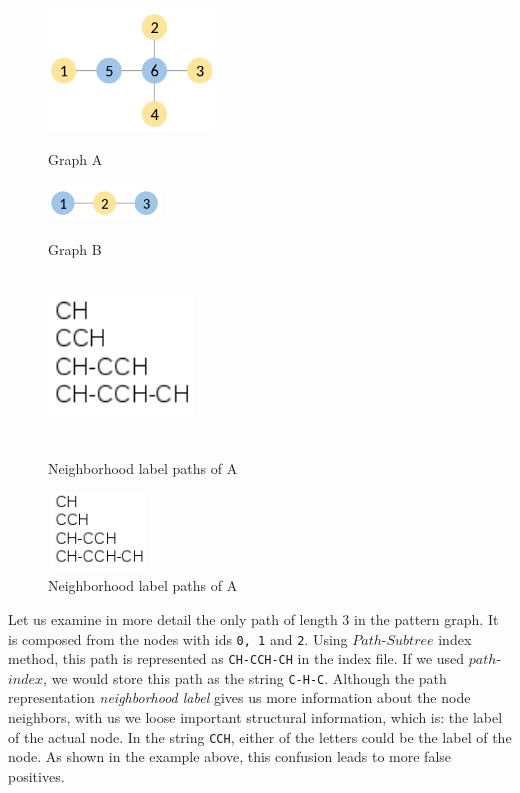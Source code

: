 \documentclass{l4proj}
\newcounter{example}[section]
\begin{document}
\begin{figure}[h]
\centering
\begin{minipage}[t]{.5\textwidth}
  \centering
  \includegraphics[height=3.3cm,width=4.4cm]{images/graphs/C2H4-1.png}
  \caption{Graph A}
  \label{C2H4-1}
\end{minipage}%
\begin{minipage}[t]{.5\textwidth}
  \centering
  \includegraphics[height=1cm,width=3cm]{images/graphs/C2H.png}
  \caption{Graph B}
  \label{C2H}
\end{minipage}%

\begin{minipage}[t]{.5\textwidth}
  \centering
  \includegraphics[height=4.4cm,width=3.9cm]{images/paths/C2H-isomer-paths.png}
  \caption{Neighborhood label paths of A}
  \label{C2H4-1-subtree-label-paths}
\end{minipage}%
\begin{minipage}[t]{.5\textwidth}
  \centering
  \includegraphics[height=2.1cm,width=2.7cm]{images/paths/C2H-isomer-paths.png}
  \caption{Neighborhood label paths of A}
  \label{C2H-subtree-label-paths}
\end{minipage}%
\end{figure}
Let us examine in more detail the only path of length 3 in the pattern graph. It is composed from the nodes with ids \texttt{0, 1} and \texttt{2}. Using $Path$-$Subtree$ index method, this path is represented as \texttt{CH-CCH-CH} in the index file. If we used $path$-$index$, we would store this path as the string \texttt{C-H-C}. Although the path representation \textit{neighborhood label} gives us more information about the node neighbors, with us we loose important structural information, which is: the label of the actual node. In the string \texttt{CCH},  either of the letters could be the label of the node. As shown in the example above, this confusion leads to more false positives.\par
\end{document}
